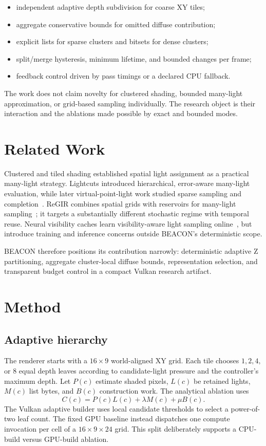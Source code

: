 \documentclass[10pt,twocolumn]{article}
\begin{document}
\begin{itemize}
  \item independent adaptive depth subdivision for coarse XY tiles;
  \item aggregate conservative bounds for omitted diffuse contribution;
  \item explicit lists for sparse clusters and bitsets for dense clusters;
  \item split/merge hysteresis, minimum lifetime, and bounded changes per frame;
  \item feedback control driven by pass timings or a declared CPU fallback.
\end{itemize}

The work does not claim novelty for clustered shading, bounded many-light approximation, or
grid-based sampling individually. The research object is their interaction and the ablations made
possible by exact and bounded modes.

\section{Related Work}
Clustered and tiled shading established spatial light assignment as a practical many-light strategy.
Lightcuts introduced hierarchical, error-aware many-light evaluation, while later virtual-point-light
work studied sparse sampling and completion~\cite{vpl}. ReGIR combines spatial grids with reservoirs
for many-light sampling~\cite{regir}; it targets a substantially different stochastic regime with
temporal reuse. Neural visibility caches learn visibility-aware light sampling online~\cite{nvc}, but
introduce training and inference concerns outside BEACON's deterministic scope.

BEACON therefore positions its contribution narrowly: deterministic adaptive Z partitioning,
aggregate cluster-local diffuse bounds, representation selection, and transparent budget control in
a compact Vulkan research artifact.

\section{Method}
\subsection{Adaptive hierarchy}
The renderer starts with a $16\times9$ world-aligned XY grid. Each tile chooses $1,2,4,$ or $8$
equal depth leaves according to candidate-light pressure and the controller's maximum depth. Let
$P(c)$ estimate shaded pixels, $L(c)$ be retained lights, $M(c)$ list bytes, and $B(c)$ construction
work. The analytical ablation uses
\begin{equation}
C(c)=P(c)L(c)+\lambda M(c)+\mu B(c).
\end{equation}
The Vulkan adaptive builder uses local candidate thresholds to select a power-of-two leaf count. The
fixed GPU baseline instead dispatches one compute invocation per cell of a $16\times9\times24$ grid.
This split deliberately supports a CPU-build versus GPU-build ablation.
\end{document}
